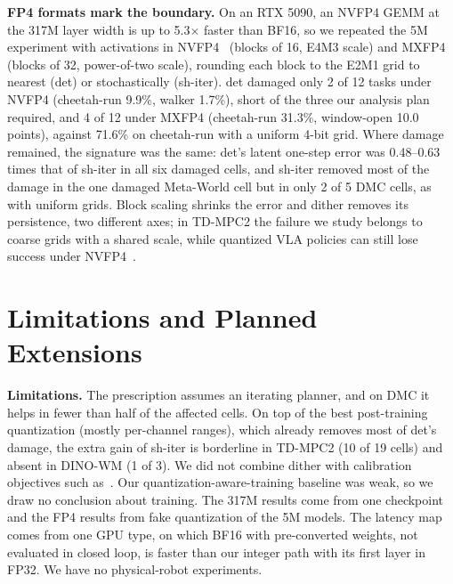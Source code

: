 \documentclass[conference]{IEEEtran}
\newcommand{\dtm}{\textsf{det}\xspace}
\newcommand{\shiter}{\textsf{sh-iter}\xspace}
\newcommand{\extsection}{Limitations and Planned Extensions}
\newcommand{\extsection}{Limitations and Stage 2 Plan}
\begin{document}
\textbf{FP4 formats mark the boundary.} On an RTX 5090, an NVFP4 GEMM at the 317M layer width is up to 5.3$\times$ faster than BF16, so we repeated the 5M experiment with activations in NVFP4~\cite{nvidia2025nvfp4} (blocks of 16, E4M3 scale) and MXFP4~\cite{rouhani2023mx} (blocks of 32, power-of-two scale), rounding each block to the E2M1 grid to nearest (\dtm) or stochastically (\shiter). \dtm damaged only 2 of 12 tasks under NVFP4 (cheetah-run 9.9\%, walker 1.7\%), short of the three our analysis plan required, and 4 of 12 under MXFP4 (cheetah-run 31.3\%, window-open 10.0 points), against 71.6\% on cheetah-run with a uniform 4-bit grid. Where damage remained, the signature was the same: \dtm's latent one-step error was 0.48--0.63 times that of \shiter in all six damaged cells, and \shiter removed most of the damage in the one damaged Meta-World cell but in only 2 of 5 DMC cells, as with uniform grids. Block scaling shrinks the error and dither removes its persistence, two different axes; in TD-MPC2 the failure we study belongs to coarse grids with a shared scale, while quantized VLA policies can still lose success under NVFP4~\cite{park2026qcrl}.

\section{\extsection}
\label{sec:limits}

\textbf{Limitations.} The prescription assumes an iterating planner, and on DMC it helps in fewer than half of the affected cells. On top of the best post-training quantization (mostly per-channel ranges), which already removes most of \dtm's damage, the extra gain of \shiter is borderline in TD-MPC2 (10 of 19 cells) and absent in DINO-WM (1 of 3). We did not combine dither with calibration objectives such as~\cite{anon2026modulemse}. Our quantization-aware-training baseline was weak, so we draw no conclusion about training. The 317M results come from one checkpoint and the FP4 results from fake quantization of the 5M models. The latency map comes from one GPU type, on which BF16 with pre-converted weights, not evaluated in closed loop, is faster than our integer path with its first layer in FP32. We have no physical-robot experiments.
\end{document}
